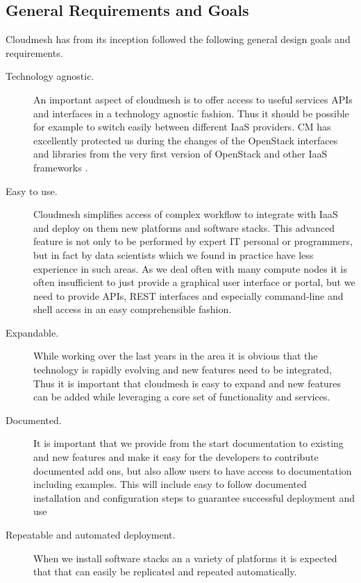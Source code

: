 \documentclass[9pt,twocolumn,twoside]{../../styles/osajnl}
\begin{document}
\subsection{General Requirements and Goals}

Cloudmesh has from its inception followed the following general design
goals and requirements.

\begin{description}
\item [Technology agnostic.] An important aspect of cloudmesh is to
  offer access to useful services APIs and interfaces in a technology
  agnostic fashion. Thus it should be possible for example to switch
  easily between different IaaS providers. CM has excellently
  protected us during the changes of the OpenStack interfaces and
  libraries from the very first version of OpenStack and other IaaS
  frameworks \cite{paper-eucalyptus}.

\item[Easy to use.] Cloudmesh simplifies access of 
  complex workflow to integrate with IaaS and deploy on them new
  platforms and software stacks. This advanced feature is not only to
  be performed by expert IT personal or programmers, but in fact by
  data scientists which we found in practice have less experience in
  such areas. As we deal often with many compute nodes it is often
  insufficient to just provide a graphical user interface or portal, but
  we need to provide APIs, REST interfaces and especially command-line
  and shell access in an easy comprehensible fashion. 

\item[Expandable.] While working over the last years in the area it is
  obvious that the technology is rapidly evolving and new features
  need to be integrated, Thus it is important that cloudmesh is easy
  to expand and new features can be added while leveraging a core set
  of functionality and services.

\item[Documented.] It is important that we provide from the start
  documentation to existing and new features and make it easy for the
  developers to contribute documented add ons, but also allow users to
  have access to documentation including examples. This will include
  easy to follow documented installation and configuration steps to
  guarantee successful deployment and use

\item[Repeatable and automated deployment.] When we install software
  stacks an a variety of platforms it is expected that that can easily
  be replicated and repeated automatically.


\end{description}
\end{document}
